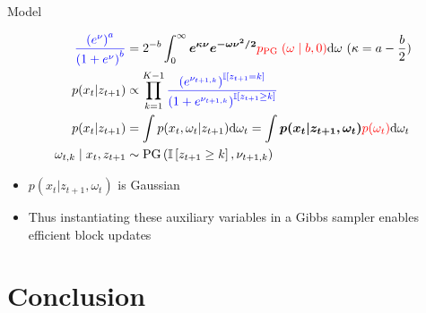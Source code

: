 \documentclass{beamer}
\begin{document}
\begin{frame}{Model}%
        \begin{tcolorbox}[colback=blue!10!white,colframe=blue!50!black,title=Polya-gamma augmentation\cite{linderman2015dependent},boxrule=2pt, boxsep=0.1em, left=0.1em, right=0.1em,
fontupper=\fontsize{8}{10}\selectfont]

\begin{align}
\textcolor{blue}{ \frac{\left(e^{\nu}\right)^{a}}{\left(1+e^{\nu}\right)^{b}} } &=2^{-b}  \int_{0}^{\infty} \boldsymbol{e^{\kappa \nu} e^{-\omega \nu^{2} / 2} }\textcolor{red} {  p_{\text {PG }}(\omega \mid b, 0) }\mathrm{d} \omega \text{ }(\kappa=a-\frac{b}{2})\\
p(x_{t}|z_{t+1}) &\propto \prod_{k=1}^{K-1} \textcolor{blue}{  \frac{\left(e^{\nu_{t+1, k}}\right)^{\mathbb{I}\left[z_{t+1}=k\right]}}{\left(1+e^{\nu_{t+1, k}}\right)^{\mathbb{I}\left[z_{t+1} \geq k\right]}} }\\
p(x_t|z_{t+1})&=\int p(x_t,\omega_t|z_{t+1})  \mathrm{d}\omega_t=\int   \boldsymbol{ p(x_t|z_{t+1},\omega_t) }\textcolor{red}{ p(\omega_t) } \mathrm{d}\omega_t  \\
\omega_{t, k} \mid x_{t}, z_{t+1} &\sim \operatorname{PG}\left(\mathbb{I}\left[z_{t+1} \geq k\right], \nu_{t+1, k}\right) 
\end{align}

\end{tcolorbox}
\begin{itemize}
\item $p(x_t|z_{t+1},\omega_t)$ is Gaussian 
\item Thus instantiating these auxiliary variables in a Gibbs
sampler enables efficient block updates
\end{itemize}

    \end{frame}


\section{Conclusion}
\end{document}
